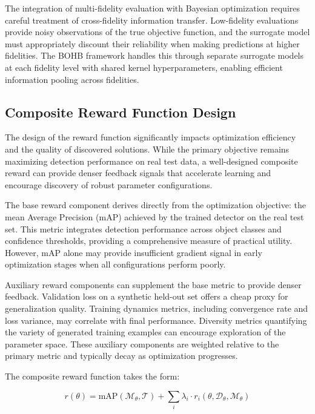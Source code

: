 The integration of multi-fidelity evaluation with Bayesian optimization requires careful treatment of cross-fidelity information transfer. Low-fidelity evaluations provide noisy observations of the true objective function, and the surrogate model must appropriately discount their reliability when making predictions at higher fidelities. The BOHB framework handles this through separate surrogate models at each fidelity level with shared kernel hyperparameters, enabling efficient information pooling across fidelities.

\subsection{Composite Reward Function Design}
\label{subsec:reward_design}

The design of the reward function significantly impacts optimization efficiency and the quality of discovered solutions. While the primary objective remains maximizing detection performance on real test data, a well-designed composite reward can provide denser feedback signals that accelerate learning and encourage discovery of robust parameter configurations.

The base reward component derives directly from the optimization objective: the mean Average Precision (mAP) achieved by the trained detector on the real test set. This metric integrates detection performance across object classes and confidence thresholds, providing a comprehensive measure of practical utility. However, mAP alone may provide insufficient gradient signal in early optimization stages when all configurations perform poorly.

Auxiliary reward components can supplement the base metric to provide denser feedback. Validation loss on a synthetic held-out set offers a cheap proxy for generalization quality. Training dynamics metrics, including convergence rate and loss variance, may correlate with final performance. Diversity metrics quantifying the variety of generated training examples can encourage exploration of the parameter space. These auxiliary components are weighted relative to the primary metric and typically decay as optimization progresses.

The composite reward function takes the form:

\begin{equation}
r(\theta) = \text{mAP}(\mathcal{M}_\theta, \mathcal{T}) + \sum_{i} \lambda_i \cdot r_i(\theta, \mathcal{D}_\theta, \mathcal{M}_\theta)
\label{eq:composite_reward}
\end{equation}

